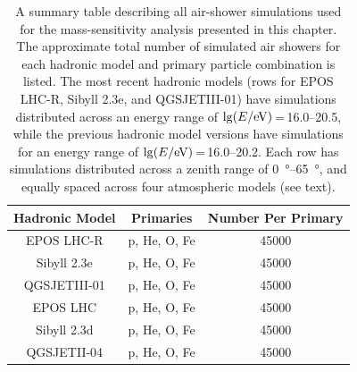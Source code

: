 \begin{table}
    \caption[Summary of simulated air-shower datasets for the mass-sensitivity analysis.]{A summary table describing all air-shower simulations used for the mass-sensitivity analysis presented in this chapter. The approximate total number of simulated air showers for each hadronic model and primary particle combination is listed. The most recent hadronic models (rows for EPOS LHC-R, Sibyll 2.3e, and QGSJETIII-01) have simulations distributed across an energy range of $\lg(E / \rm eV)$\,=\,\numrange{16.0}{20.5}, while the previous hadronic model versions have simulations for an energy range of $\lg(E / \rm eV)$\,=\,\numrange{16.0}{20.2}. Each row has simulations distributed across a zenith range of \qtyrange{0}{65}{\degree}, and equally spaced across four atmospheric models (see text).} \label{tab:simulations}
    \vspace*{.5\baselineskip}
    \centering
    \begin{tabular}{|| c | c | c ||}
      \hline
        Hadronic Model & Primaries & Number Per Primary \\ %
        \hline
        \hline
        EPOS LHC-R   & p, He, O, Fe & 45000 \\
        Sibyll 2.3e  & p, He, O, Fe & 45000 \\
        QGSJETIII-01 & p, He, O, Fe & 45000 \\
        \hline
        EPOS LHC    & p, He, O, Fe & 45000 \\
        Sibyll 2.3d & p, He, O, Fe & 45000 \\
        QGSJETII-04 & p, He, O, Fe & 45000 \\
        \hline
    \end{tabular}
\end{table}



